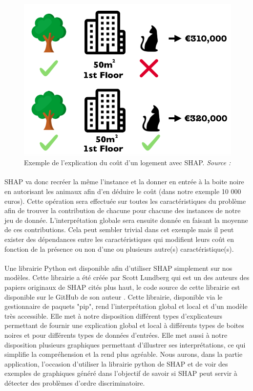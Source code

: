 \begin{figure}[h]
\centering
\includegraphics[scale=0.3]{src_img/shapleyExemple.png}
\caption{Exemple de l'explication du coût d'un logement avec SHAP. \textit{Source : \cite{molnar2019}}}
\label{shapleyExemple}
\end{figure}

\paragraph{}SHAP va donc recréer la même l'instance et la donner en entrée à la boite noire en autorisant les animaux afin d'en déduire le coût (dans notre exemple 10 000 euros). Cette opération sera effectuée sur toutes les caractéristiques du problème afin de trouver la contribution de chacune pour chacune des instances de notre jeu de donnée. L'interprétation globale sera ensuite donnée en faisant la moyenne de ces contributions. Cela peut sembler trivial dans cet exemple mais il peut exister des dépendances entre les caractéristiques qui modifient leurs coût en fonction de la présence ou non d'une ou plusieurs autre(s) caractéristique(s).

\paragraph{}Une librairie Python est disponible afin d'utiliser SHAP simplement sur nos modèles. Cette librairie a été créée par Scott Lundberg qui est un des auteurs des papiers originaux de SHAP cités plus haut, le code source de cette librairie est disponible sur le GitHub de son auteur \cite{shapDepot}. Cette librairie, disponible via le gestionnaire de paquets "pip", rend l'interprétation global et local et d'un modèle très accessible. Elle met à notre disposition différent types d'explicateurs permettant de fournir une explication global et local à différents types de boites noires et pour différents types de données d'entrées. Elle met aussi à notre disposition plusieurs graphiques permettant d'illustrer ses interprétations, ce qui simplifie la compréhension et la rend plus agréable.  Nous aurons, dans la partie application, l'occasion d'utiliser la librairie python de SHAP et de voir des exemples de graphiques généré dans l'objectif de savoir si SHAP peut servir à détecter des problèmes d'ordre discriminatoire.



